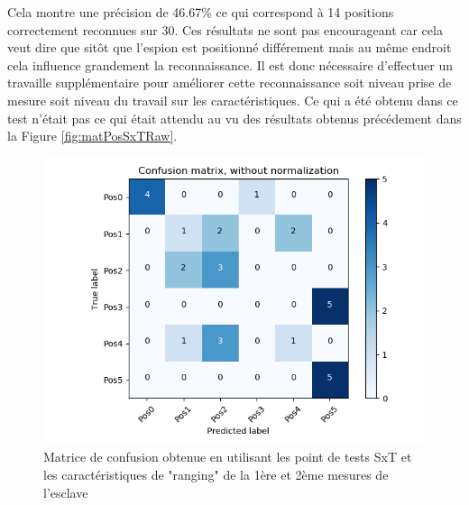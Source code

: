 Cela montre une précision de 46.67\% ce qui correspond à 14 positions correctement reconnues sur 30. Ces résultats ne sont pas encourageant car cela veut dire que sitôt que l'espion est positionné différement mais au même endroit cela influence grandement la reconnaissance. Il est donc nécessaire d'effectuer un travaille supplémentaire pour améliorer cette reconnaissance soit niveau prise de mesure soit niveau du travail sur les caractéristiques. Ce qui a été obtenu dans ce test n'était pas ce qui était attendu au vu des résultats obtenus précédement dans la Figure \ref{fig:matPosSxTRaw}.
\begin{figure}[htp]
	\begin{center}
		\includegraphics[scale=0.5]{figures/mat_pos_SxT_rawall.png}
		\caption{Matrice de confusion obtenue en utilisant les point de tests SxT et les caractéristiques de "ranging" de la 1ère et 2ème mesures de l'esclave}
		\label{fig:matPosSxTRawall} %
	\end{center}
\end{figure}

